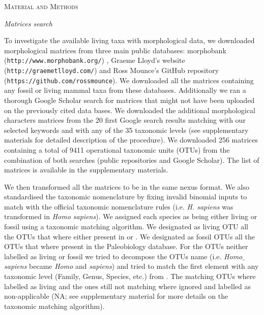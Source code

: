 \documentclass[12pt,letterpaper]{article}
\renewcommand{\section}[1]{%
\bigskip
\begin{center}
\begin{Large}
\normalfont\scshape #1
\medskip
\end{Large}
\end{center}}
\renewcommand{\subsection}[1]{%
\bigskip
\begin{center}
\begin{large}
\normalfont\itshape #1
\end{large}
\end{center}}
\begin{document}

%
%
 

\section{Material and Methods}
\subsection{Matrices search}
To investigate the available living taxa with morphological data, we downloaded morphological matrices from three main public databases: morphobank (\texttt{http://www.morphobank.org/}) \cite{morphobank}, Graeme Lloyd's website (\texttt{http://graemetlloyd.com/}) and Ross Mounce's GitHub repository (\texttt{https://github.com/rossmounce}). We downloaded all the matrices containing any fossil or living mammal taxa from these databases. Additionally we ran a thorough Google Scholar search for matrices that might not have been uploaded on the previously cited data bases. We downloaded the additional morphological characters matrices from the 20 first Google search results matching with our selected keywords and with any of the 35 taxonomic levels (see supplementary materials for detailed description of the procedure). We downloaded 256 %
matrices containing a total of 9411 %
operational taxonomic units (OTUs) from the combination of both searches (public repositories and Google Scholar). The list of matrices is available in the supplementary materials.

We then transformed all the matrices to be in the same nexus format. We also standardised the taxonomic nomenclature by fixing invalid binomial inputs to match with the official taxonomic nomenclature rules (i.e. \textit{H. sapiens} was transformed in \textit{Homo sapiens}). We assigned each species as being either living or fossil using a taxonomic matching algorithm. We designated as living OTU all the OTUs that where either present in \cite{FritzTree} or \cite{wilson2005mammal}. We designated as fossil OTUs all the OTUs that where present in the Paleobiology database. For the OTUs neither labelled as living or fossil we tried to decompose the OTUs name (i.e. \textit{Homo$\_$sapiens} became \textit{Homo} and \textit{sapiens}) and tried to match the first element with any taxonomic level (Family, Genus, Species, etc.) from \cite{wilson2005mammal}. The matching OTUs where labelled as living and the ones still not matching where ignored and labelled as non-applicable (NA; see supplementary material for more details on the taxonomic matching algorithm).
\end{document}
